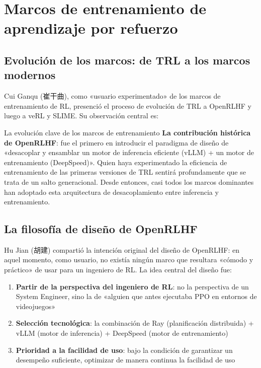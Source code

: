 \section{Marcos de entrenamiento de aprendizaje por refuerzo}

\subsection{Evolución de los marcos: de TRL a los marcos modernos}

Cui Ganqu (崔干曲), como «usuario experimentado» de los marcos de entrenamiento de RL, presenció el proceso de evolución de TRL a OpenRLHF y luego a veRL y SLIME. Su observación central es:

\begin{importantbox}{La evolución clave de los marcos de entrenamiento}
\textbf{La contribución histórica de OpenRLHF}: fue el primero en introducir el paradigma de diseño de «desacoplar y ensamblar un motor de inferencia eficiente (vLLM) + un motor de entrenamiento (DeepSpeed)». Quien haya experimentado la eficiencia de entrenamiento de las primeras versiones de TRL sentirá profundamente que se trata de un salto generacional. Desde entonces, casi todos los marcos dominantes han adoptado esta arquitectura de desacoplamiento entre inferencia y entrenamiento.
\end{importantbox}

\subsection{La filosofía de diseño de OpenRLHF}

Hu Jian (胡建) compartió la intención original del diseño de OpenRLHF: en aquel momento, como usuario, no existía ningún marco que resultara «cómodo y práctico» de usar para un ingeniero de RL. La idea central del diseño fue:

\begin{enumerate}
    \item \textbf{Partir de la perspectiva del ingeniero de RL}: no la perspectiva de un System Engineer, sino la de «alguien que antes ejecutaba PPO en entornos de videojuegos»
    \item \textbf{Selección tecnológica}: la combinación de Ray (planificación distribuida) + vLLM (motor de inferencia) + DeepSpeed (motor de entrenamiento)
    \item \textbf{Prioridad a la facilidad de uso}: bajo la condición de garantizar un desempeño suficiente, optimizar de manera continua la facilidad de uso
\end{enumerate}

